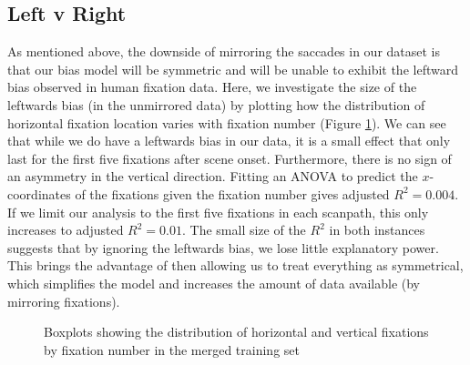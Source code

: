 \documentclass[a4paper, twocolumn, oneside, 11pt]{article}
\begin{document}
\subsection{Left v Right}
\label{sec:LeftRight}

As mentioned above, the downside of mirroring the saccades in our dataset is that our bias model will be symmetric and will be unable to exhibit the leftward bias observed in human fixation data. Here, we investigate the size of the leftwards bias (in the unmirrored data) by plotting how the distribution of horizontal fixation location varies with fixation number (Figure \ref{fig:leftrightDist}). We can see that while we do have a leftwards bias in our data, it is a small effect that only last for the first five fixations after scene onset. Furthermore, there is no sign of an asymmetry in the vertical direction. Fitting an ANOVA to predict the $x$-coordinates of the fixations given the fixation number gives adjusted $R^2=0.004$. If we limit our analysis to the first five fixations in each scanpath, this only increases to adjusted $R^2=0.01$. The small size of the $R^2$ in both instances suggests that by ignoring the leftwards bias, we lose little explanatory power. This brings the advantage of then allowing us to treat everything as symmetrical, which simplifies the model and increases the amount of data available (by mirroring fixations). 

\begin{figure}
\centering
{}
\caption{Boxplots showing the distribution of horizontal and vertical fixations by fixation number in the merged training set}
\label{fig:leftrightDist}
\end{figure}
\end{document}
